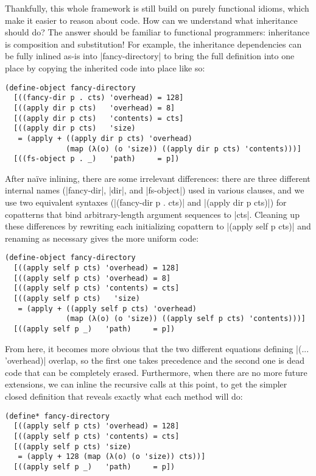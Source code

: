 Thankfully, this whole framework is still build on purely functional idioms, which make it easier to reason about code.
How can we understand what inheritance should do?
The answer should be familiar to functional programmers: inheritance is composition and substitution!
For example, the inheritance dependencies can be fully inlined as-is into \scm|fancy-directory| to bring the full definition into one place by copying the inherited code into place like so:
\begin{verbatim}
(define-object fancy-directory
  [((fancy-dir p . cts) 'overhead) = 128]
  [((apply dir p cts)   'overhead) = 8]
  [((apply dir p cts)   'contents) = cts]
  [((apply dir p cts)   'size)
   = (apply + ((apply dir p cts) 'overhead)
              (map (λ(o) (o 'size)) ((apply dir p cts) 'contents)))]
  [((fs-object p . _)   'path)     = p])
\end{verbatim}
After na\"ive inlining, there are some irrelevant differences: there are three different internal names (\scm|fancy-dir|, \scm|dir|, and \scm|fs-object|) used in various clauses, and we use two equivalent syntaxes  (\scm|(fancy-dir p . cts)| and \scm|(apply dir p cts)|) for copatterns that bind arbitrary-length argument sequences to \scm|cts|.
Cleaning up these differences by rewriting each initializing copattern to \scm|(apply self p cts)| and renaming as necessary gives the more uniform code:
\begin{verbatim}
(define-object fancy-directory
  [((apply self p cts) 'overhead) = 128]
  [((apply self p cts) 'overhead) = 8]
  [((apply self p cts) 'contents) = cts]
  [((apply self p cts)   'size)
   = (apply + ((apply self p cts) 'overhead)
              (map (λ(o) (o 'size)) ((apply self p cts) 'contents)))]
  [((apply self p _)   'path)     = p])
\end{verbatim}
From here, it becomes more obvious that the two different equations defining \scm|(... 'overhead)| overlap, so the first one takes precedence and the second one is dead code that can be completely erased.
Furthermore, when there are no more future extensions, we can inline the recursive calls at this point, to get the simpler closed definition that reveals exactly what each method will do:
\begin{verbatim}
(define* fancy-directory
  [((apply self p cts) 'overhead) = 128]
  [((apply self p cts) 'contents) = cts]
  [((apply self p cts) 'size)
   = (apply + 128 (map (λ(o) (o 'size)) cts))]
  [((apply self p _)   'path)     = p])
\end{verbatim}

